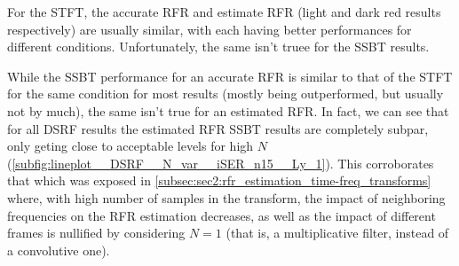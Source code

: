 For the STFT, the accurate RFR and estimate RFR (light and dark red results respectively) are usually similar, with each having better performances for different conditions. Unfortunately, the same isn't truee for the SSBT results.

While the SSBT performance for an accurate RFR is similar to that of the STFT for the same condition for most results (mostly being outperformed, but usually not by much), the same isn't true for an estimated RFR. In fact, we can see that for all DSRF results the estimated RFR SSBT results are completely subpar, only geting close to acceptable levels for high $N$ (\cref{subfig:lineplot__DSRF__N_var__iSER_n15__Ly_1}). This corroborates that which was exposed in \cref{subsec:sec2:rfr_estimation_time-freq_transforms} where, with high number of samples in the transform, the impact of neighboring frequencies on the RFR estimation decreases, as well as the impact of different frames is nullified by considering $N = 1$ (that is, a multiplicative filter, instead of a convolutive one).